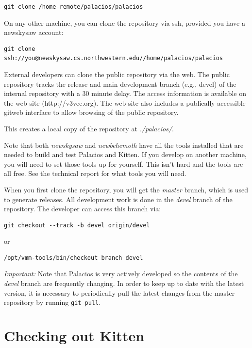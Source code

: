 \documentclass[11pt]{article}
\begin{document}
\begin{verbatim}
git clone /home-remote/palacios/palacios
\end{verbatim}


On any other machine, you can clone the repository via ssh, provided
you have a newskysaw account:
 
\begin{verbatim}
git clone ssh://you@newskysaw.cs.northwestern.edu//home/palacios/palacios
\end{verbatim}

External developers can clone the public repository via the web.  The
public repository tracks the release and main development branch
(e.g., devel) of the internal repository with a 30 minute delay.  The
access information is available on the web site (http://v3vee.org).
The web site also includes a publically accessible gitweb interface to
allow browsing of the public repository.

This creates a local copy of the repository at {\em ./palacios/}.

Note that both {\em newskysaw} and {\em newbehemoth} have all the
tools installed that are needed to build and test Palacios and Kitten.
If you develop on another machine, you will need to set those tools up
for yourself.  This isn't hard and the tools are all free.  See the
technical report for what tools you will need.

When you first clone the repository, you will get the {\em master}
branch, which is used to generate releases.   All development work is
done in the {\em devel} branch of the repository. The developer can
access this branch via:

\begin{verbatim}
git checkout --track -b devel origin/devel
\end{verbatim}

or 

\begin{verbatim}
/opt/vmm-tools/bin/checkout_branch devel
\end{verbatim}

{\em Important:}
Note that Palacios is very actively developed so the contents of the
{\em devel} branch are frequently changing. In order to keep up to
date with the latest version, it is necessary to periodically pull the
latest changes from the master repository by running \verb.git pull..



\section{Checking out Kitten}
\end{document}
